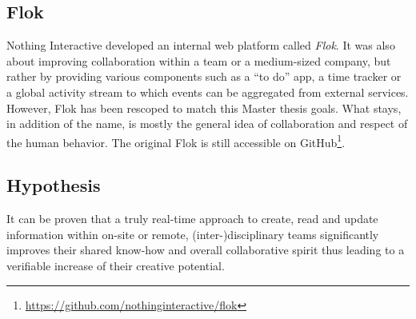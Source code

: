 \documentclass[a4paper,12pt, oneside]{article}
\begin{document}
\subsection{Flok}
Nothing Interactive developed an internal web platform called \emph{Flok}.
It was also about improving collaboration within a team or a medium-sized company, but rather by providing various components such as a “to do” app, a time tracker or a global activity stream to which events can be aggregated from external services.
However, Flok has been rescoped to match this Master thesis goals.
What stays, in addition of the name, is mostly the general idea of collaboration and respect of the human behavior.
The original Flok is still accessible on GitHub\footnote{\url{https://github.com/nothinginteractive/flok}}.

\subsection{Hypothesis}
\label{hypothesis}
It can be proven that a truly real-time approach to create, read and update information within on-site or remote, (inter-)disciplinary teams significantly improves their shared know-how and overall collaborative spirit thus leading to a verifiable increase of their creative potential.

%
%
\end{document}
